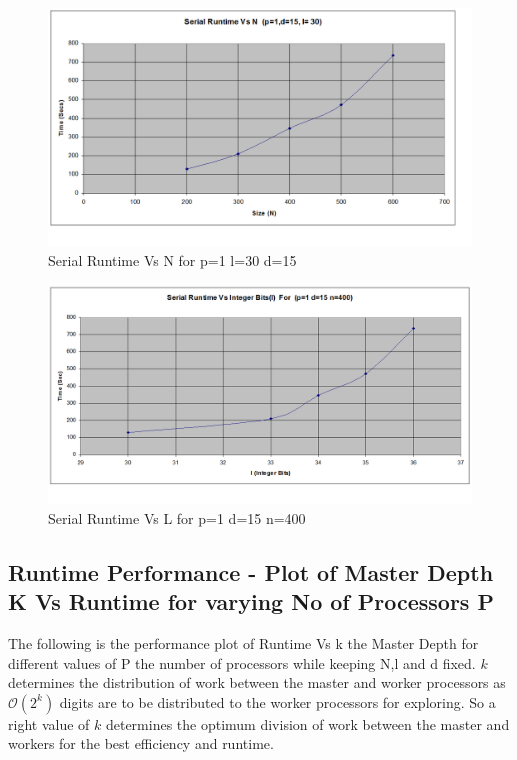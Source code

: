 \documentclass[twoside,11pt]{article}\usepackage{amsmath,amsfonts,amsthm,fullpage}
\begin{document}
\begin{figure}[!htbp]
\centering
\includegraphics[scale=.46]{images/p1-l=30-d=15} 
\caption{Serial Runtime Vs N for p=1 l=30 d=15}
\label{Serial Runtime Vs N for p=1 l=30 d=15}
\end{figure}

\begin{figure}[!htbp]
\centering
\includegraphics[scale=.46]{images/p1-vl-d=15} 
\caption{Serial Runtime Vs L for p=1 d=15 n=400}
\label{Serial Runtime Vs L for p=1 d=15 n=400}
\end{figure}




\pagebreak
\subsection{Runtime Performance - Plot of Master Depth K Vs Runtime for varying No of Processors P}
The following is the performance plot of Runtime Vs k the Master Depth for different values of P the number of processors while keeping N,l and d fixed. $k$ determines the distribution of work between the master and worker processors as $\mathcal{O}(2^k)$ digits are to be distributed to the worker processors for exploring. So a right value of $k$ determines the optimum division of work between the master and workers for the best efficiency and runtime.
\end{document}
